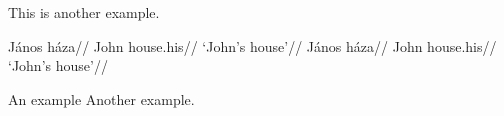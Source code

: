 \documentclass[12pt,letterpaper]{article}
\begin{document}
\begin{exe}
\ex This is another example.
\end{exe}
\begin{exe}
\ex\label{bar}
\begin{xlist}
\ex    \begingl
    \gla{}J\'anos h\'aza//
    \glb{}John house.his//
    \glft `John's house'//
    \endgl
\ex    \begingl
    \gla{}J\'anos h\'aza//
    \glb{}John house.his//
    \glft `John's house'//
    \endgl
\end{xlist}
\ex
\begin{xlist}
\ex An example\setcounter{xnumi}{0}
\ex Another example.
\end{xlist}
\end{exe}
\end{document}
